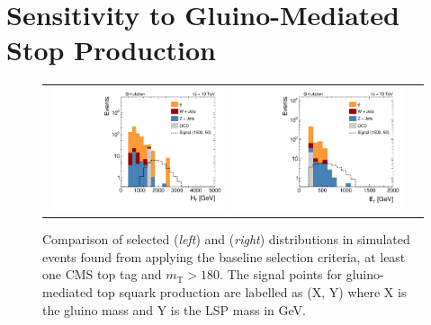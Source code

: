 \section{Sensitivity to Gluino-Mediated Stop Production}
\label{sec:stop_gluinos}
\begin{figure}[!t]
  \centering
  \begin{tabular}{cc}
   
      \includegraphics[width=0.49\textwidth]{figures/Stop_TopTagTransverseMass_HThad_GluinoT1tttt.pdf}  
      \includegraphics[width=0.49\textwidth]{figures/Stop_TopTagTransverseMass_MET_GluinoT1tttt.pdf} 
    \end{tabular}
 
  \caption{Comparison of selected \HT (\textit{left}) and \met (\textit{right}) distributions in simulated events found from applying the baseline selection criteria, at least one CMS top tag and $m_\mathrm{T} > 180$\gev. The signal points for gluino-mediated top squark production are labelled as (X, Y) where X is the gluino mass and Y is the LSP mass in GeV.}
  \label{fig:stop_gluinos_ht_met}
\end{figure}
